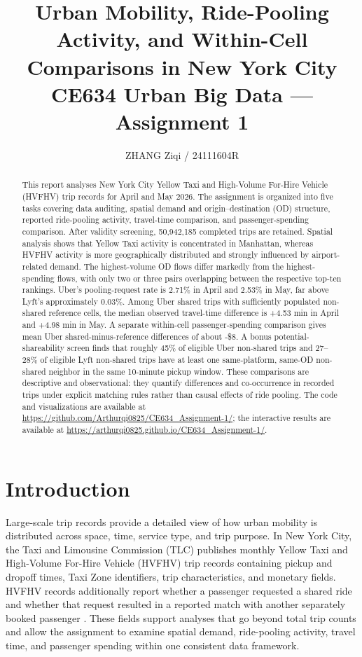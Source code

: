 \documentclass[10pt,a4paper]{article}
\title{\textbf{Urban Mobility, Ride-Pooling Activity, and Within-Cell Comparisons in New York City}\\[0.35em]
\large CE634 Urban Big Data --- Assignment 1}
\author{%
ZHANG Ziqi / 24111604R}
\date{}
\newcommand{\usd}{\$}
\begin{document}
\maketitle

\begin{abstract}
This report analyses New York City Yellow Taxi and High-Volume For-Hire Vehicle (HVFHV) trip records for April and May 2026. The assignment is organized into five tasks covering data auditing, spatial demand and origin--destination (OD) structure, reported ride-pooling activity, travel-time comparison, and passenger-spending comparison. After validity screening, 50,942,185 completed trips are retained. Spatial analysis shows that Yellow Taxi activity is concentrated in Manhattan, whereas HVFHV activity is more geographically distributed and strongly influenced by airport-related demand. The highest-volume OD flows differ markedly from the highest-spending flows, with only two or three pairs overlapping between the respective top-ten rankings. Uber's pooling-request rate is 2.71\% in April and 2.53\% in May, far above Lyft's approximately 0.03\%. Among Uber shared trips with sufficiently populated non-shared reference cells, the median observed travel-time difference is +4.53 min in April and +4.98 min in May. A separate within-cell passenger-spending comparison gives mean Uber shared-minus-reference differences of about -\usd8. A bonus potential-shareability screen finds that roughly 45\% of eligible Uber non-shared trips and 27--28\% of eligible Lyft non-shared trips have at least one same-platform, same-OD non-shared neighbor in the same 10-minute pickup window. These comparisons are descriptive and observational: they quantify differences and co-occurrence in recorded trips under explicit matching rules rather than causal effects of ride pooling. The code and visualizations are available at \url{https://github.com/Arthurqi0825/CE634_Assignment-1/}; the interactive results are available at \url{https://arthurqi0825.github.io/CE634_Assignment-1/}.
\end{abstract}

\section{Introduction}
Large-scale trip records provide a detailed view of how urban mobility is distributed across space, time, service type, and trip purpose. In New York City, the Taxi and Limousine Commission (TLC) publishes monthly Yellow Taxi and High-Volume For-Hire Vehicle (HVFHV) trip records containing pickup and dropoff times, Taxi Zone identifiers, trip characteristics, and monetary fields. HVFHV records additionally report whether a passenger requested a shared ride and whether that request resulted in a reported match with another separately booked passenger \cite{tlc_tripdata,tlc_hvfhv}. These fields support analyses that go beyond total trip counts and allow the assignment to examine spatial demand, ride-pooling activity, travel time, and passenger spending within one consistent data framework.
\end{document}
